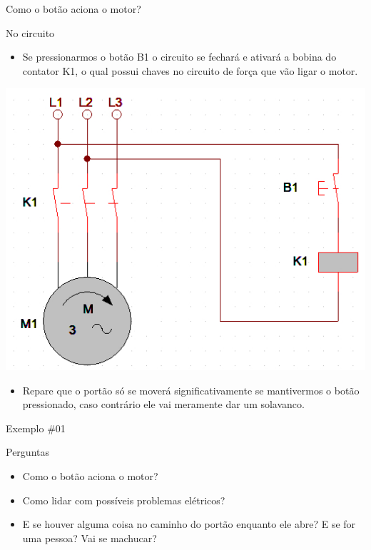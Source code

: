 \begin{frame}{Como o botão aciona o motor?}
	\begin{block}{No circuito}
		\begin{itemize}
			\item Se pressionarmos o botão B1 o circuito se fechará e ativará a bobina do contator K1, o qual possui chaves no circuito de força que vão ligar o motor.
		\end{itemize}
	\end{block}
	\centerline{\includegraphics[width=0.4\linewidth]{Figuras/Ch05/fig8.jpg}}
	\begin{block}{}
		\begin{itemize}
			\item Repare que o portão só se moverá significativamente se mantivermos o botão pressionado, caso contrário ele vai meramente dar um solavanco.
		\end{itemize}
	\end{block}
\end{frame}

\begin{frame}{Exemplo \#01}
	\begin{block}{Perguntas}
		\begin{itemize}
			\item Como o botão aciona o motor? \checkmark
			\item Como lidar com possíveis problemas elétricos?
			\item E se houver alguma coisa no caminho do portão enquanto ele abre? E se for uma pessoa? Vai se machucar?
		\end{itemize}
	\end{block}
\end{frame}

